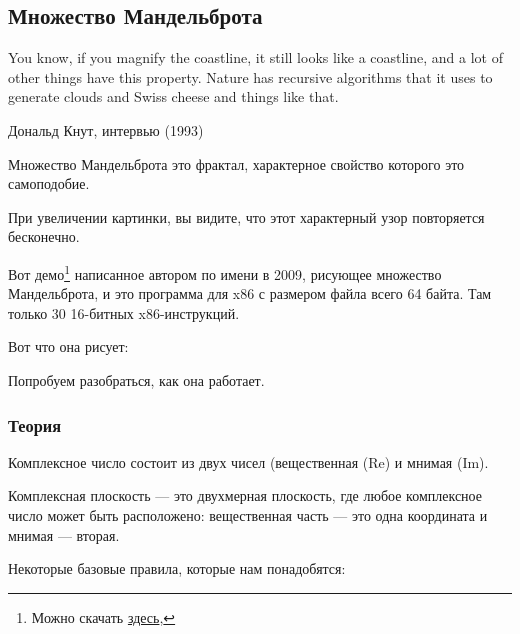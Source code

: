 ﻿\clearpage
\subsection{Множество Мандельброта}
\label{Mandelbrot_demo}

\epigraph{You know, if you magnify the coastline, it still looks like
a coastline, and a lot of other things have this property. Nature has
recursive algorithms that it uses to generate clouds and Swiss cheese
and things like that.}
{Дональд Кнут, интервью (1993)}

Множество Мандельброта это фрактал, характерное свойство которого это самоподобие.

При увеличении картинки, вы видите, что этот характерный узор повторяется бесконечно.

Вот демо\footnote{Можно скачать \href{http://go.yurichev.com/17306} {здесь},} 
написанное автором по имени  в 2009, 
рисующее множество Мандельброта, и это программа для x86 с размером файла всего 64 байта.
Там только 30 16-битных x86-инструкций.

Вот что она рисует:

\begin{figure}[H]
\centering
{}
\end{figure}

Попробуем разобраться, как она работает.

\subsubsection{Теория}


Комплексное число состоит из двух чисел (вещественная (Re) и мнимая (Im).

Комплексная плоскость --- это двухмерная плоскость, где любое комплексное число может быть расположено:
вещественная часть --- это одна координата и мнимая --- вторая.

Некоторые базовые правила, которые нам понадобятся:

